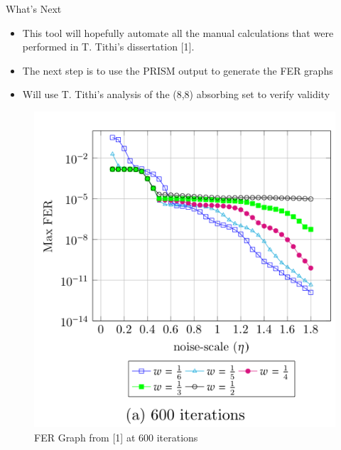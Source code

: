 \documentclass[10pt,ignorenonframetext,]{beamer}
\providecommand{\tightlist}{%
  \setlength{\itemsep}{0pt}\setlength{\parskip}{0pt}}
\begin{document}
\begin{frame}{What's Next}
\protect\hypertarget{whats-next}{}
\begin{itemize}[<+->]
\tightlist
\item
  This tool will hopefully automate all the manual calculations that
  were performed in T. Tithi's dissertation {[}1{]}.
\item
  The next step is to use the PRISM output to generate the FER graphs
\item
  Will use T. Tithi's analysis of the (8,8) absorbing set to verify
  validity
\end{itemize}

\begin{figure}
\centering
\includegraphics{figures/thumbnail_Ngdbf-error-floor.cgi.png}
\caption{FER Graph from {[}1{]} at 600 iterations}
\end{figure}
\end{frame}
\end{document}
